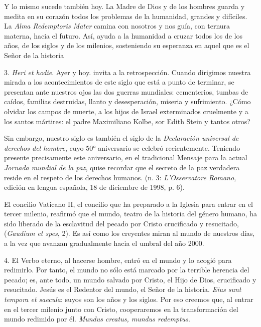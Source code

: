 \begin{body}
\begin{body}
Y lo mismo sucede también hoy. La Madre de Dios y de los hombres guarda y medita en su corazón todos los problemas de la humanidad, grandes y difíciles. La \emph{Alma Redemptoris Mater} camina con nosotros y nos guía, con ternura materna, hacia el futuro. Así, ayuda a la humanidad a cruzar todos los  de los años, de los siglos y de los milenios, sosteniendo su esperanza en aquel que es el Señor de la historia

3. \emph{Heri et hodie}. Ayer y hoy.  invita a la retrospección. Cuando dirigimos nuestra mirada a los acontecimientos de este siglo que está a punto de terminar, se presentan ante nuestros ojos las dos guerras mundiales: cementerios, tumbas de caídos, familias destruidas, llanto y desesperación, miseria y sufrimiento. ¿Cómo olvidar los campos de muerte, a los hijos de Israel exterminados cruelmente y a los santos mártires: el padre Maximiliano Kolbe, sor Edith Stein y tantos otros?

Sin embargo, nuestro siglo es también el siglo de la \emph{Declaración universal de derechos del hombre}, cuyo 50° aniversario se celebró recientemente. Teniendo presente precisamente este aniversario, en el tradicional Mensaje para la actual \emph{Jornada mundial de la paz}, quise recordar que el secreto de la paz verdadera reside en el respeto de los derechos humanos.  (n. 3: \emph{L'Osservatore Romano}, edición en lengua española, 18 de diciembre de 1998, p. 6).

El concilio Vaticano II, el concilio que ha preparado a la Iglesia para entrar en el tercer milenio, reafirmó que el mundo, teatro de la historia del género humano, ha sido liberado de la esclavitud del pecado por Cristo crucificado y resucitado,  (\emph{Gaudium et spes}, 2). Es así como los creyentes miran al mundo de nuestros días, a la vez que avanzan gradualmente hacia el umbral del año 2000.

4. El Verbo eterno, al hacerse hombre, entró en el mundo y lo acogió para redimirlo. Por tanto, el mundo no sólo está marcado por la terrible herencia del pecado; es, ante todo, un mundo salvado por Cristo, el Hijo de Dios, crucificado y resucitado. Jesús es el Redentor del mundo, el Señor de la historia. \emph{Eius sunt tempora et saecula}: suyos son los años y los siglos. Por eso creemos que, al entrar en el tercer milenio junto con Cristo, cooperaremos en la transformación del mundo redimido por él. \emph{Mundus creatus, mundus redemptus}.


\end{body}
\end{body}
